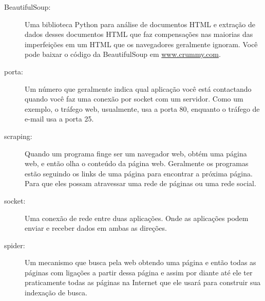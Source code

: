 \begin{description}

\item[BeautifulSoup:] Uma biblioteca Python para análise de documentos HTML e
extração de dados desses documentos HTML que faz compensações nas maiorias das
imperfeições em um HTML que os navegadores geralmente ignoram. Você pode
baixar o código da BeautifulSoup em \url{www.crummy.com}.

\item[porta:] Um número que geralmente indica qual aplicação você está
contactando quando você faz uma conexão por socket com um servidor. Como um
exemplo, o tráfego web, usualmente, usa a porta 80, enquanto o tráfego de
e-mail usa a porta 25.

\item[scraping:] Quando um programa finge ser um navegador web, obtém uma página
web, e então olha o conteúdo da página web. Geralmente os programas estão
seguindo os links de uma página para encontrar a próxima página. Para que
eles possam atravessar uma rede de páginas ou uma rede social.

\item[socket:] Uma conexão de rede entre duas aplicações. Onde as aplicações
podem enviar e receber dados em ambas as direções.

\item[spider:] Um mecanismo que busca pela web obtendo uma página e então todas
as páginas com ligações a partir dessa página e assim por diante até ele ter
praticamente todas as páginas na Internet que ele usará para construir sua
indexação de busca.

\end{description}
